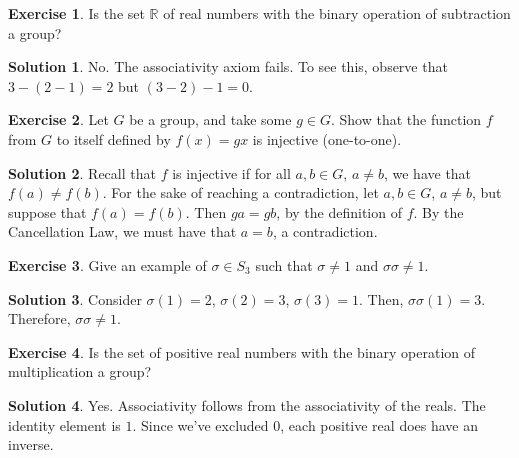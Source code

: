 \documentclass[12pt]{article}
\theoremstyle{definition}
\newtheorem{exercise}{\color{YellowOrange}Exercise}
\theoremstyle{definition}
\newtheorem{solution}{\color{Goldenrod}Solution}
\begin{document}
\begin{exercise}
Is the set $\mathbb{R}$ of real numbers with the binary operation of subtraction a group?
\end{exercise}
\begin{solution}
No. The associativity axiom fails. To see this, observe that $3 - (2 - 1) = 2$ but $(3 - 2) - 1 = 0$. 
\end{solution}

\begin{exercise}
Let $G$ be a group, and take some $g \in G$. Show that the function $f$ from $G$ to itself defined by $f(x)=gx$ is injective (one-to-one).
\end{exercise} 
\begin{solution}
Recall that $f$ is injective if for all $a, b \in G$, $a \neq b$, we have that $f(a) \neq f(b)$. For the sake of reaching a contradiction, let $a,b \in G$, $a \neq b$, but suppose that $f(a) = f(b)$. Then $ga = gb$, by the definition of $f$. By the Cancellation Law, we must have that $a = b$, a contradiction.
\end{solution}

\begin{exercise}
Give an example of $\sigma \in S_3$ such that $\sigma \neq 1$ and $\sigma \sigma \neq 1$.
\end{exercise}
\begin{solution}
Consider $\sigma(1) = 2$, $\sigma(2) = 3$, $\sigma(3) = 1$. Then, $\sigma \sigma(1)=3$. Therefore, $\sigma\sigma \neq 1$.
\end{solution}

\begin{exercise}
Is the set of positive real numbers with the binary operation of multiplication a group?
\end{exercise}
\begin{solution}
Yes. Associativity follows from the associativity of the reals. The identity element is $1$. Since we've excluded $0$, each positive real does have an inverse.
\end{solution}
\end{document}

